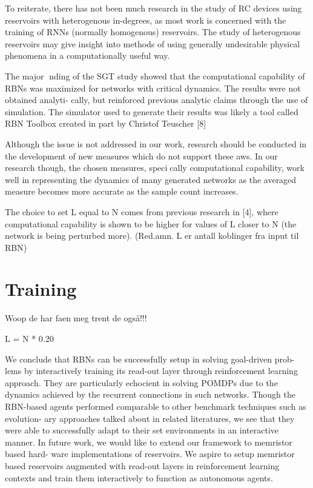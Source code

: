 To reiterate, there
has not been much research in the study of RC devices using reservoirs with
heterogenous
in-degrees,  as  most  work  is  concerned  with  the  training  of  RNNs  (normally  homogenous)
reservoirs.   The  study  of  heterogenous  reservoirs  may  give  insight  into  methods  of  using
generally undesirable physical phenomena in a computationally useful way.


The major nding of the SGT study showed that the computational capability of RBNs
was maximized for networks with critical dynamics.  The results were not obtained analyti-
cally, but reinforced previous analytic claims through the use of simulation.  The simulator
used to generate their results was likely a tool called
RBN Toolbox
created in part by Christof
Teuscher [8]


Although the issue is not
addressed in our work, research should be conducted in the development of new measures
which do not support these 
aws.  In our research though,  the chosen measures,  specically
computational capability, work well in representing the dynamics of many generated networks
as the averaged measure becomes more accurate as the sample count increases.

The choice to set L equal to N comes from previous
research in [4], where computational capability is shown to be higher for values of
L closer to N (the network is being perturbed more).
(Red.amn. L er antall koblinger fra input til RBN)

\section{Training}
Woop de har faen meg trent de også!!!
\cite{how-to-train-your-rbn}

L = N * 0.20

We conclude that RBNs can be successfully setup in solving goal-driven prob-
lems  by  interactively  training  its  read-out  layer  through  reinforcement  learning
approach.  They are particularly echocient in solving POMDPs due to the dynamics
achieved by the recurrent connections in such networks.  Though the RBN-based
agents  performed  comparable  to  other  benchmark  techniques  such  as  evolution-
ary approaches talked about in related literatures, we see that they were able to
successfully adapt to their set environments in an interactive manner.
In future work, we would like to extend our framework to memristor based hard-
ware implementations of reservoirs.  We aspire to setup memristor based reservoirs
augmented with read-out layers in reinforcement learning contexts and train them
interactively to function as autonomous agents.
